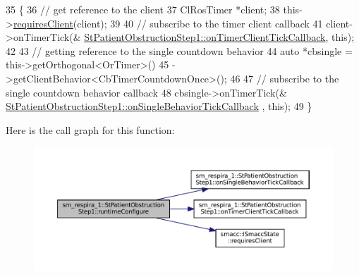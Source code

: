 \begin{DoxyCode}
35     \{
36         \textcolor{comment}{// get reference to the client}
37         ClRosTimer *client;
38         this->\hyperlink{classsmacc_1_1ISmaccState_a7f95c9f0a6ea2d6f18d1aec0519de4ac}{requiresClient}(client);
39 
40         \textcolor{comment}{// subscribe to the timer client callback}
41         client->onTimerTick(&
      \hyperlink{structsm__respira__1_1_1StPatientObstructionStep1_a330f5d86b827dedd1ca72d7356215c49}{StPatientObstructionStep1::onTimerClientTickCallback}, \textcolor{keyword}{
      this});
42 
43         \textcolor{comment}{// getting reference to the single countdown behavior}
44         \textcolor{keyword}{auto} *cbsingle = this->getOrthogonal<OrTimer>()
45                              ->getClientBehavior<CbTimerCountdownOnce>();
46 
47         \textcolor{comment}{// subscribe to the single countdown behavior callback}
48         cbsingle->onTimerTick(&
      \hyperlink{structsm__respira__1_1_1StPatientObstructionStep1_a87a086647c2ec7b38f86f17d2719c89b}{StPatientObstructionStep1::onSingleBehaviorTickCallback}
      , \textcolor{keyword}{this});
49     \}
\end{DoxyCode}
Here is the call graph for this function\+:
\nopagebreak
\begin{figure}[H]
\begin{center}
\leavevmode
\includegraphics[width=350pt]{structsm__respira__1_1_1StPatientObstructionStep1_a99ac90de739317e8c0c47916fafd057a_cgraph}
\end{center}
\end{figure}
\mbox{\label{structsm__respira__1_1_1StPatientObstructionStep1_a935f38ebd60546b7c6e03655d041206d}} 
